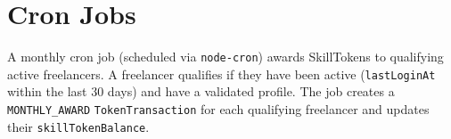 \section{Cron Jobs}

A monthly cron job (scheduled via \texttt{node-cron}) awards SkillTokens to qualifying active freelancers. A freelancer qualifies if they have been active (\texttt{lastLoginAt} within the last 30 days) and have a validated profile. The job creates a \texttt{MONTHLY\_AWARD} \texttt{TokenTransaction} for each qualifying freelancer and updates their \texttt{skillTokenBalance}.
